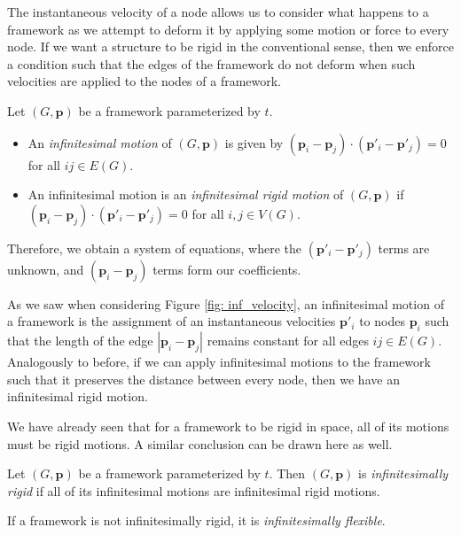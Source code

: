 \begin{flushleft}
The instantaneous velocity of a node allows us to consider what happens to a framework as we attempt to deform it by applying some motion or force to every node. If we want a structure to be rigid in the conventional sense, then we enforce a condition such that the edges of the framework do not deform when such velocities are applied to the nodes of a framework. 
\end{flushleft}

\begin{definition}
\label{def: inf motion}
Let $(G,\mathbf{p})$ be a framework parameterized by $t$. 
\begin{itemize}
    \item An \textit{infinitesimal motion} of $(G,\mathbf{p})$ is given by $(\mathbf{p}_i - \mathbf{p}_j) \cdot (\mathbf{p}'_i - \mathbf{p}'_j) = 0$ for all $ij \in  E(G)$. 
    \vspace{-3mm}
    \item An infinitesimal motion is an \textit{infinitesimal rigid motion} of $(G,\mathbf{p})$ if $(\mathbf{p}_i - \mathbf{p}_j) \cdot (\mathbf{p}'_i - \mathbf{p}'_j) = 0$ for all $i,j \in  V(G)$. 
\end{itemize}
\noindent
Therefore, we obtain a system of equations, where the $(\mathbf{p}'_i - \mathbf{p}'_j)$ terms are unknown, and $(\mathbf{p}_i - \mathbf{p}_j)$ terms form our coefficients.
\end{definition}

\begin{flushleft}
As we saw when considering Figure \ref{fig: inf_velocity}, an infinitesimal motion of a framework is the assignment of an instantaneous velocities $\mathbf{p}'_i$ to nodes $\mathbf{p}_i$ such that the length of the edge $|\mathbf{p}_i - \mathbf{p}_j|$ remains constant for all edges $ij \in E(G)$. Analogously to before, if we can apply infinitesimal motions to the framework such that it preserves the distance between every node, then we have an infinitesimal rigid motion. 
\end{flushleft}

\begin{flushleft}
We have already seen that for a framework to be rigid in space, all of its motions must be rigid motions. A similar conclusion can be drawn here as well.
\end{flushleft}

\begin{definition}
\label{def: inf rigid}
Let $(G,\mathbf{p})$ be a framework parameterized by $t$. Then $(G,\mathbf{p})$ is \textit{infinitesimally rigid} if all of its infinitesimal motions are infinitesimal rigid motions.

\noindent
If a framework is not infinitesimally rigid, it is \textit{infinitesimally flexible}.
\end{definition}

